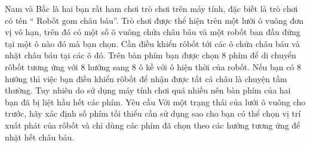 Nam và  Bắc là hai bạn rất ham chơi trò chơi trên máy tính, đặc biết là trò chơi có tên “ Robốt gom châu báu”. Trò chơi được thể hiện trên một lưới ô vuông đơn vị vô hạn, trên đó có một số ô vuông chứa châu báu và một robốt ban đầu đứng tại một ô nào đó mà bạn chọn. Cần điều khiển rôbốt tới các ô chứa châu báu và nhặt châu báu tại các ô đó. Trên bàn phím bạn được chọn 8 phím để di chuyển rôbốt tương ứng với 8 hướng sang 8 ô kề với ô hiện thời của robốt. Nếu bạn có 8 hướng thì việc bạn điều khiển rôbốt để nhận được tất cả châu là chuyện tầm thường. Tuy nhiên do sử dụng máy tính chơi quá nhiều nên bàn phím của hai bạn đã bị liệt hầu hết các phím.
   Yêu cầu  
Với một trạng thái của lưới ô vuông cho trước, hãy xác định số phím tối thiểu cần sử dụng sao cho bạn có thể chọn vị trí xuất phát của rôbốt và chỉ dùng các phím đã chọn theo các hướng tương ứng để nhặt hết châu báu.